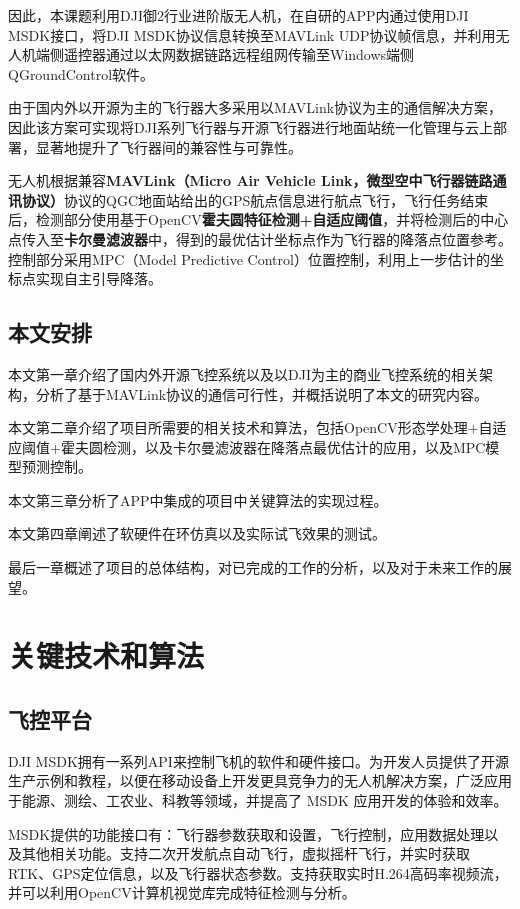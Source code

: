 因此，本课题利用DJI御2行业进阶版无人机，在自研的APP内通过使用DJI MSDK接口\cite{Net2}，将DJI MSDK协议信息转换至MAVLink UDP协议帧信息，并利用无人机端侧遥控器通过以太网数据链路远程组网传输至Windows端侧QGroundControl软件。

由于国内外以开源为主的飞行器大多采用以MAVLink协议为主的通信解决方案，因此该方案可实现将DJI系列飞行器与开源飞行器进行地面站统一化管理与云上部署，显著地提升了飞行器间的兼容性与可靠性。

无人机根据兼容\textbf{MAVLink（Micro Air Vehicle Link，微型空中飞行器链路通讯协议）}协议的QGC地面站给出的GPS航点信息进行航点飞行，飞行任务结束后，检测部分使用基于OpenCV\textbf{霍夫圆特征检测+自适应阈值}，并将检测后的中心点传入至\textbf{卡尔曼滤波器}中，得到的最优估计坐标点作为飞行器的降落点位置参考。控制部分采用MPC（Model Predictive Control）位置控制，利用上一步估计的坐标点实现自主引导降落。

\section{本文安排}

本文第一章介绍了国内外开源飞控系统以及以DJI为主的商业飞控系统的相关架构，分析了基于MAVLink协议的通信可行性，并概括说明了本文的研究内容。

本文第二章介绍了项目所需要的相关技术和算法，包括OpenCV形态学处理+自适应阈值+霍夫圆检测，以及卡尔曼滤波器在降落点最优估计的应用，以及MPC模型预测控制。

本文第三章分析了APP中集成的项目中关键算法的实现过程。

本文第四章阐述了软硬件在环仿真以及实际试飞效果的测试。

最后一章概述了项目的总体结构，对已完成的工作的分析，以及对于未来工作的展望。

\chapter{关键技术和算法}
\section{飞控平台}

DJI MSDK拥有一系列API来控制飞机的软件和硬件接口。为开发人员提供了开源生产示例和教程，以便在移动设备上开发更具竞争力的无人机解决方案，广泛应用于能源、测绘、工农业、科教等领域，并提高了 MSDK 应用开发的体验和效率。

MSDK提供的功能接口有：飞行器参数获取和设置，飞行控制，应用数据处理以及其他相关功能。支持二次开发航点自动飞行，虚拟摇杆飞行，并实时获取RTK、GPS定位信息，以及飞行器状态参数。支持获取实时H.264高码率视频流，并可以利用OpenCV计算机视觉库完成特征检测与分析。

